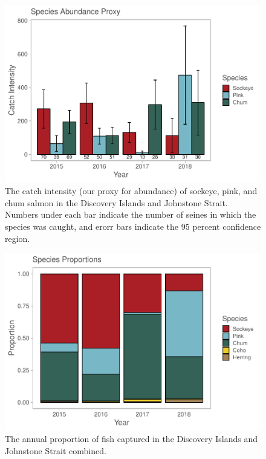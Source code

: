 \documentclass[fleqn,10pt]{wlpeerj} %
\begin{document}
\begin{figure}[H]
\includegraphics[width=0.9\linewidth]{Migration_Observations_Report_files/figure-latex/catch-intensity-plot-1} \caption{The catch intensity (our proxy for abundance) of sockeye, pink, and chum salmon in the Discovery Islands and Johnstone Strait. Numbers under each bar indicate the number of seines in which the species was caught, and erorr bars indicate the 95 percent confidence region.}\label{fig:catch-intensity-plot}
\end{figure}

\begin{figure}[H]
\includegraphics[width=0.9\linewidth]{Migration_Observations_Report_files/figure-latex/proportion-plot-1} \caption{The annual proportion of fish captured in the Discovery Islands and Johnstone Strait combined.}\label{fig:proportion-plot}
\end{figure}
\end{document}
